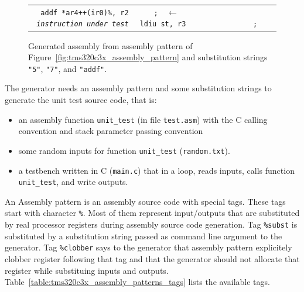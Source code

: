 \begin{figure}[!h]
\begin{center}
\begin{minipage}{\textwidth}
\begin{center}
\begin{supertabular}{|p{16cm}|}
{{				\texttt{~~addf~*ar4++(ir0)\%,~r2~~~~~~;  \it ~$\leftarrow$~instruction~under~test}\newline
				\texttt{~~ldiu~st,~r3~~~~~~~~~~~~~~~~; }\newline
				\texttt{}}}\\
				\end{supertabular}
				\caption{\label{fig:tms320c3x_generated_assembly} Generated assembly from assembly pattern of Figure~\ref{fig:tms320c3x_assembly_pattern} and substitution strings \texttt{"5"}, \texttt{"7"}, and \texttt{"addf"}.}
			\end{center}
		\end{minipage}
	\end{center}
\end{figure}

The generator needs an assembly pattern and some substitution strings to generate the unit test source code, that is:
\begin{itemize}
\item an assembly function \texttt{unit\_test} (in file \texttt{test.asm}) with the C calling convention and stack parameter passing convention
\item some random inputs for function \texttt{unit\_test} (\texttt{random.txt}).
\item a testbench written in C (\texttt{main.c}) that in a loop, reads inputs, calls function \texttt{unit\_test}, and write outputs.
\end{itemize}

An Assembly pattern is an assembly source code with special tags. These tags start with character \texttt{\%}. Most of them represent input/outputs that are substituted by real processor registers during assembly source code generation. Tag \texttt{\%subst} is substituted by a substitution string passed as command line argument to the generator.
Tag \texttt{\%clobber} says to the generator that assembly pattern explicitely clobber register following that tag and that the generator should not allocate that register while substituing inputs and outputs.
Table~\ref{table:tms320c3x_assembly_patterns_tags} lists the available tags.


